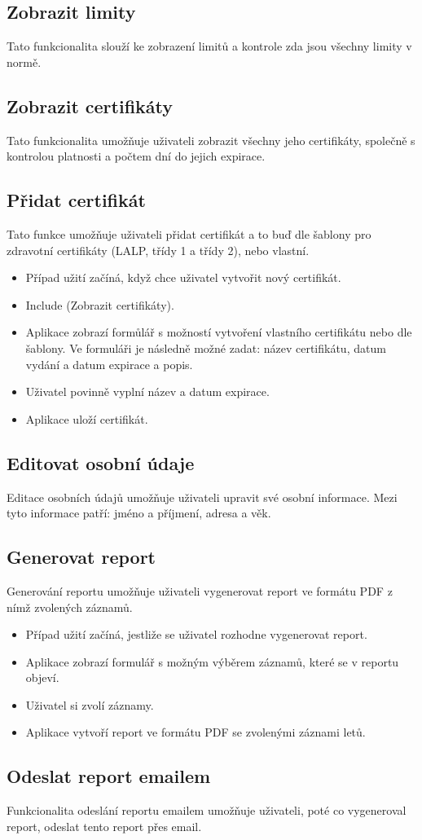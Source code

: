 \subsection{Zobrazit limity}
Tato funkcionalita slouží ke zobrazení limitů a kontrole zda jsou všechny limity v normě.

\subsection{Zobrazit certifikáty}
Tato funkcionalita umožňuje uživateli zobrazit všechny jeho certifikáty, společně s kontrolou platnosti a počtem dní do jejich expirace.


\subsection{Přidat certifikát}
Tato funkce umožňuje uživateli přidat certifikát a to buď dle šablony pro zdravotní certifikáty (LALP, třídy 1 a třídy 2), nebo vlastní.

\begin{itemize}
\item Případ užití začíná, když chce uživatel vytvořit nový certifikát.
\item Include (Zobrazit certifikáty).
\item Aplikace zobrazí formůlář s možností vytvoření vlastního certifikátu nebo dle šablony. Ve formuláři je následně možné zadat: název certifikátu, datum vydání a datum expirace a popis.
\item Uživatel povinně vyplní název a datum expirace.
\item Aplikace uloží certifikát.
\end{itemize}

\subsection{Editovat osobní údaje}
Editace osobních údajů umožňuje uživateli upravit své osobní informace. Mezi tyto informace patří: jméno a příjmení, adresa a věk.

\subsection{Generovat report}
Generování reportu umožňuje uživateli vygenerovat report ve formátu PDF z nímž zvolených záznamů.

\begin{itemize}
\item Případ užití začíná, jestliže se uživatel rozhodne vygenerovat report.
\item Aplikace zobrazí formulář s možným výběrem záznamů, které se v reportu objeví.
\item Uživatel si zvolí záznamy.
\item Aplikace vytvoří report ve formátu PDF se zvolenými záznami letů.
\end{itemize}


\subsection{Odeslat report emailem}
Funkcionalita odeslání reportu emailem umožňuje uživateli, poté co vygeneroval report, odeslat tento report přes email.



